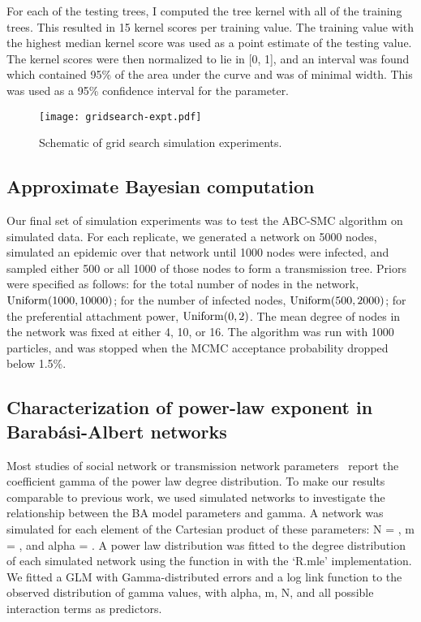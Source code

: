 For each of the testing trees, I computed the tree kernel with all of the
training trees. This resulted in 15 kernel scores per training value. The
training value with the highest median kernel score was used as a point
estimate of the testing value. The kernel scores were then normalized to lie in
[0, 1], and an interval was found which contained 95\% of the area under the
curve and was of minimal width. This was used as a 95\% confidence interval for
the parameter.

\begin{figure}[ht]
  \centering
  \texttt{[image: gridsearch-expt.pdf]}
  \caption{Schematic of grid search simulation experiments.}
  \label{fig:gridsearch}
\end{figure}

\subsection{Approximate Bayesian computation}

Our final set of simulation experiments was to test the ABC-SMC algorithm on
simulated data. For each replicate, we generated a network on 5000 nodes,
simulated an epidemic over that network until 1000 nodes were infected, and
sampled either 500 or all 1000 of those nodes to form a transmission tree.
Priors were specified as follows: for the total number of nodes in the network,
$\operatorname{Uniform}(1000, 10000)$; for the number of infected nodes, $\operatorname{Uniform}(500,
2000)$; for the preferential attachment power, $\operatorname{Uniform}(0, 2)$. The mean
degree of nodes in the network was fixed at either 4, 10, or 16. The
algorithm was run with 1000 particles, and was stopped when the \gls{MCMC}
acceptance probability dropped below 1.5\%.

\subsection{Characterization of power-law exponent in Barab\'asi-Albert networks}

Most studies of social network or transmission network
parameters~\autocite[e.g.][]{liljeros2001web, jones2003assessment,
schneeberger2004scale, brown2011transmission} report the coefficient
\gls{gamma} of the power law degree distribution. To make our results
comparable to previous work, we used simulated networks to investigate the
relationship between the \gls{BA} model parameters and \gls{gamma}. A network
was simulated for each element of the Cartesian product of these parameters:
\gls{N} = , \gls{m} = , and
\gls{alpha} = . A power law distribution was
fitted to the degree distribution of each simulated network using the
 function in  with the `R.mle'
implementation. We fitted a \gls{GLM} with Gamma-distributed errors and a log
link function to the observed distribution of \gls{gamma} values, with
\gls{alpha}, \gls{m}, \gls{N}, and all possible interaction terms as
predictors.

